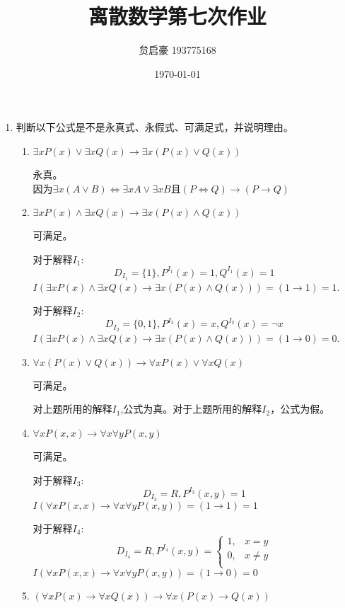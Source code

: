 \documentclass[UTF8]{ctexart}
\title{离散数学第七次作业}
\author{贠启豪 193775168}
\date{\today}
\begin{document}
    \maketitle
    \begin{enumerate}
        \item 判断以下公式是不是永真式、永假式、可满足式，并说明理由。
        \begin{enumerate}
            \item $ \exists xP(x)\vee \exists xQ(x)\rightarrow \exists x(P(x)\vee Q(x)) $
            
            永真。\\ 因为$\exists x(A \vee B)\Leftrightarrow \exists x A \vee \exists x B$且$(P\Leftrightarrow Q) \rightarrow (P\rightarrow Q)$
            \item $ \exists xP(x)\wedge \exists xQ(x)\rightarrow \exists x(P(x)\wedge Q(x))$
            
            可满足。
            
            对于解释$I_1$:
            \[
                D_{I_1}=\{1\},P^{I_1}(x)=1,Q^{I_1}(x)=1
            \]
            $I(\exists xP(x)\wedge \exists xQ(x)\rightarrow \exists x(P(x)\wedge Q(x)))=(1\rightarrow 1)=1$.

            对于解释$I_2$:
            \[
                D_{I_2}=\{0,1\},P^{I_2}(x)=x,Q^{I_2}(x)=\neg x
            \]
            $I(\exists xP(x)\wedge \exists xQ(x)\rightarrow \exists x(P(x)\wedge Q(x)))=(1\rightarrow 0)=0$.
            \item $\forall x(P(x)\vee Q(x))\rightarrow \forall xP(x)\vee \forall xQ(x)$
            
            可满足。
            
            对上题所用的解释$I_1$,公式为真。对于上题所用的解释$I_2$，公式为假。

            \item $ \forall xP(x,x)\rightarrow \forall x\forall yP(x,y)$
            
            可满足。
            
            对于解释$I_3$:
            \[
                D_{I_3}=R,P^{I_3}(x,y)=1
            \]
            $I(\forall xP(x,x)\rightarrow \forall x\forall yP(x,y))=(1\rightarrow 1)=1$

            对于解释$I_4$:
            \[
                D_{I_4}=R,P^{I_4}(x,y)=
                \begin{cases}
                    1, &x=y\\
                    0, &x\neq y\\
                \end{cases}
            \]
            $I(\forall xP(x,x)\rightarrow \forall x\forall yP(x,y))=(1\rightarrow 0)=0$
            \item $ (\forall xP(x)\rightarrow \forall xQ(x))\rightarrow \forall x(P(x)\rightarrow Q(x))$
            

\end{enumerate}
\end{enumerate}
\end{document}
